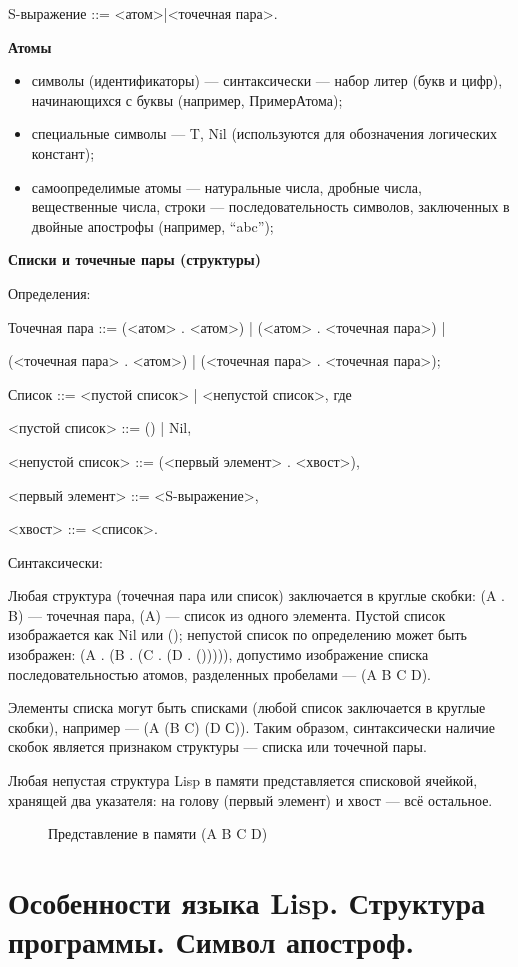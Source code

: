 \documentclass[12pt]{report}
\newcommand{\img}[3] {
    \begin{figure}[h]
        \center{\texttt{[image: img/\#2]}}
        \caption{#3}
        \label{img:#2}
    \end{figure}
}
\begin{document}
S-выражение ::= <атом>|<точечная пара>.

\textbf{Атомы}
\begin{itemize}
    \item символы (идентификаторы) --- синтаксически --- набор литер (букв и цифр), начинающихся с буквы (например, ПримерАтома);
    \item специальные символы --- {T, Nil} (используются для обозначения логических констант);
    \item самоопределимые атомы --- натуральные числа, дробные числа, вещественные числа, строки --- последовательность символов, заключенных в двойные апострофы (например, “abc”);
\end{itemize} 
		
\textbf{Списки и точечные пары (структуры)}

Определения:

Точечная пара ::= (<атом> . <атом>) | (<атом> . <точечная пара>) | 

(<точечная пара> . <атом>) | (<точечная пара> . <точечная пара>);
		
Список ::= <пустой список> | <непустой список>, где 
		
<пустой список> ::= () | Nil,
		
<непустой список> ::= (<первый элемент> . <хвост>),
		
<первый элемент> ::= <S-выражение>,
		
<хвост> ::= <список>.


Синтаксически:

Любая структура (точечная пара или список) заключается в круглые скобки: (A . B) --- точечная пара, (A) --- список из одного элемента. Пустой список изображается как Nil или (); непустой список по определению может быть изображен: (A . (B . (C . (D . ())))),  допустимо изображение списка последовательностью атомов, разделенных пробелами --- (A B C D).

Элементы списка могут быть списками (любой список заключается в круглые скобки), например --- (A (B C) (D С)). Таким образом, синтаксически наличие скобок является признаком структуры --- списка или точечной пары.

Любая непустая структура Lisp в памяти представляется списковой ячейкой, хранящей два указателя: на голову (первый элемент) и хвост --- всё остальное.

\img{25mm}{list1}{Представление в памяти (A B C D)}


\section{Особенности языка Lisp. Структура программы. Символ апостроф.}
\end{document}
